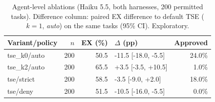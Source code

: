 \begin{table}[t]\centering\caption{Agent-level ablations (Haiku 5.5, both harnesses, 200 permitted tasks). Difference column: paired EX difference to default TSE ($k{=}1$, \emph{auto}) on the same tasks (95\% CI). Exploratory.}\label{tab:ablation}
\footnotesize\begin{tabular}{lrrlr}\hline\textbf{Variant/policy} & $n$ & \textbf{EX (\%)} & $\Delta$ \textbf{(pp)} & \textbf{Approved} \\\hline
tse\_k0/auto & 200 & 50.5 & -11.5 [-18.0, -5.5] & 24.0\% \\
tse\_k2/auto & 200 & 65.5 & +3.5 [-3.5, +10.5] & 1.0\% \\
tse/strict & 200 & 58.5 & -3.5 [-9.0, +2.0] & 18.0\% \\
tse/deny & 200 & 51.5 & -10.5 [-16.0, -5.5] & 0.0\% \\
\hline\end{tabular}\end{table}
